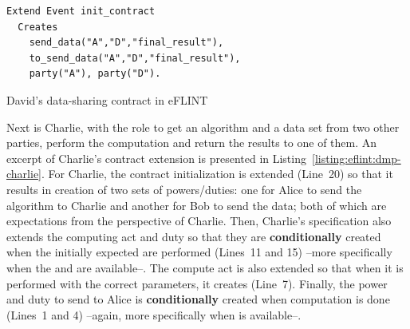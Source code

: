 \begin{listing}[h]
\centering
\begin{tcolorbox}[left=2pt,right=2pt,top=2pt,bottom=2pt,arc=0pt,
                  boxrule=0pt,toprule=1pt,
                  colback=white]
\begin{verbatim}
Extend Event init_contract
  Creates  
    send_data("A","D","final_result"),
    to_send_data("A","D","final_result"),
    party("A"), party("D").
\end{verbatim}
\end{tcolorbox}
\caption{David's data-sharing contract in eFLINT}
\label{listing:eflint:dmp-david}
\end{listing}

Next is Charlie, with the role to get an algorithm and a data set from two other parties, perform the computation and return the results to one of them. An excerpt of Charlie's contract extension is presented in Listing~\ref{listing:eflint:dmp-charlie}. For Charlie, the contract initialization is extended (Line~20) so that it results in creation of two sets of powers/duties: one for Alice to send the algorithm to Charlie and another for Bob to send the data; both of which are expectations from the perspective of Charlie. Then, Charlie's specification also extends the computing act and duty so that they are \textbf{conditionally} created when the initially expected  are performed (Lines~11 and 15) --more specifically when the  and  are available--. The compute act is also extended so that when it is performed with the correct parameters, it creates  (Line~7). Finally, the power and duty to send  to Alice is \textbf{conditionally} created when computation is done (Lines~1 and 4) --again, more specifically when  is available--. 

